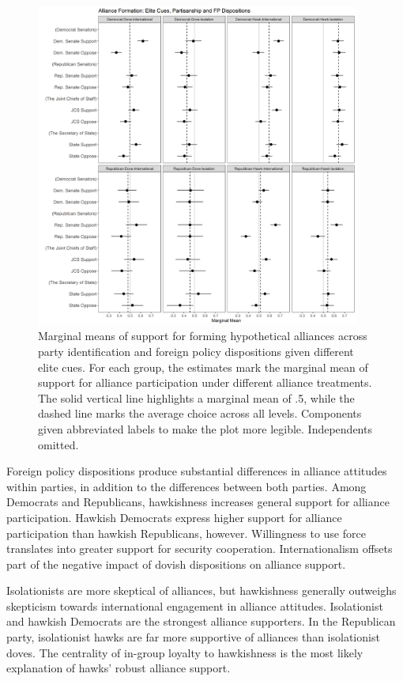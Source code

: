 \documentclass[12pt]{article}
\begin{document}
\begin{figure}[htpb]
	\centering
		\includegraphics[width=0.95\textwidth]{../figures/party-dispo-form-el.png}
	\caption{Marginal means of support for forming hypothetical alliances across party identification and foreign policy dispositions given different elite cues. For each group, the estimates mark the marginal mean of support for alliance participation under different alliance treatments. The solid vertical line highlights a marginal mean of .5, while the dashed line marks the average choice across all levels. Components given abbreviated labels to make the plot more legible. Independents omitted.}
	\label{fig:party-dispo-form-el}
\end{figure}


Foreign policy dispositions produce substantial differences in alliance attitudes within parties, in addition to the differences between both parties. 
Among Democrats and Republicans, hawkishness increases general support for alliance participation.
Hawkish Democrats express higher support for alliance participation than hawkish Republicans, however. 
Willingness to use force translates into greater support for security cooperation. 
Internationalism offsets part of the negative impact of dovish dispositions on alliance support. 


Isolationists are more skeptical of alliances, but hawkishness generally outweighs skepticism towards international engagement in alliance attitudes. 
Isolationist and hawkish Democrats are the strongest alliance supporters. 
In the Republican party, isolationist hawks are far more supportive of alliances than isolationist doves.
The centrality of in-group loyalty to hawkishness \citep{Kertzeretal2014} is the most likely explanation of hawks' robust alliance support. 
\end{document}
